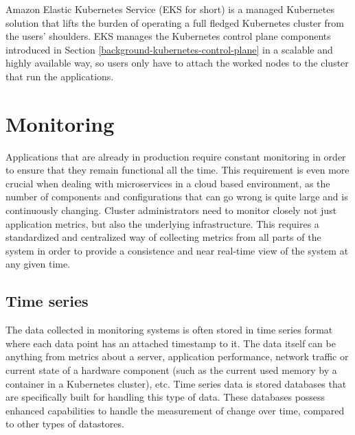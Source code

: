 Amazon Elastic Kubernetes Service (EKS for short) is a managed Kubernetes solution that lifts the burden of operating a full fledged Kubernetes cluster from the users' shoulders. EKS manages the Kubernetes control plane components introduced in Section \ref{background-kubernetes-control-plane} in a scalable and highly available way, so users only have to attach the worked nodes to the cluster that run the applications. \cite{AWSEKS}

\section{Monitoring}

Applications that are already in production require constant monitoring in order to ensure that they remain functional all the time. This requirement is even more crucial when dealing with microservices in a cloud based environment, as the number of components and configurations that can go wrong is quite large and is continuously changing. Cluster administrators need to monitor closely not just application metrics, but also the underlying infrastructure. This requires a standardized and centralized way of collecting metrics from all parts of the system in order to provide a consistence and near real-time view of the system at any given time.

\subsection{Time series}

The data collected in monitoring systems is often stored in time series format where each data point has an attached timestamp to it. The data itself can be anything from metrics about a server, application performance, network traffic or current state of a hardware component (such as the current used memory by a container in a Kubernetes cluster), etc. Time series data is stored databases that are specifically built for handling this type of data. These databases possess enhanced capabilities to handle the measurement of change over time, compared to other types of datastores. \cite{TimeSeriesInflux}


